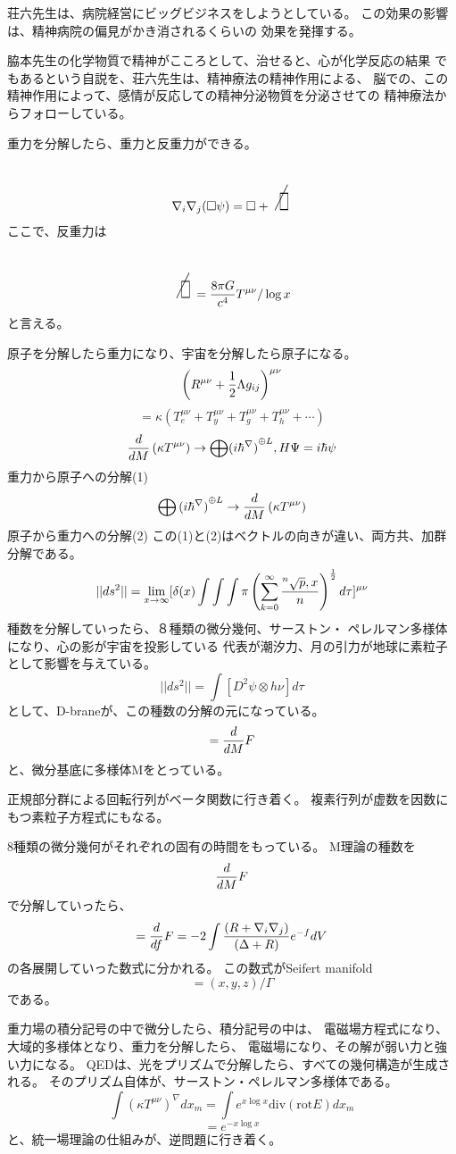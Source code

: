 \documentclass{jsarticle}
\begin{document}
    荘六先生は、病院経営にビッグビジネスをしようとしている。
    この効果の影響は、精神病院の偏見がかき消されるくらいの
    効果を発揮する。

    脇本先生の化学物質で精神がこころとして、治せると、心が化学反応の結果
    でもあるという自説を、荘六先生は、精神療法の精神作用による、
    脳での、この精神作用によって、感情が反応しての精神分泌物質を分泌させての
    精神療法からフォローしている。


      重力を分解したら、重力と反重力ができる。
  $$ \nabla_{i} \nabla_{j}(\square \psi) = \square + 
  \scalebox{1}[2]{\alearletter} $$
  ここで、反重力は
  $$ \scalebox{1}[2]{\alearletter} = 
  {{{{8 \pi G} \over {c^4}}T^{\mu\nu}}/ \log x} $$
  と言える。 

   

     原子を分解したら重力になり、宇宙を分解したら原子になる。
     $$ \left(R^{\mu\nu} + {1 \over 2}\Lambda g_{ij}\right)^{\mu\nu} $$
     $$ = \kappa \left( T^{\mu\nu}_e + T^{\mu\nu}_y + T^{\mu\nu}_g +
     T^{\mu\nu}_h + \cdots \right) $$
     $$ {d \over dM}\left({\kappa T^{\mu\nu}} \right) \to {\bigoplus 
     ({i {\hbar^{{\nabla}}})}^{\oplus L}}, H \Psi = i \hbar \psi $$
     重力から原子への分解(1)
     $$ \bigoplus {({i \hbar^{\nabla})}^{\oplus L}} \to
          {d \over dM}\left(\kappa T^{\mu\nu} \right) $$ 
	  原子から重力への分解(2)
	  この(1)と(2)はベクトルの向きが違い、両方共、加群分解である。
    $$ ||ds^2|| = \lim_{x \to \infty} [\delta(x) 
    \int \int \int \pi \left( \sum_{k=0}^{\infty}
		{{}^n\sqrt{p},x \over n} \right)^{1 \over 2}d \tau]^{\mu\nu} $$
		種数を分解していったら、８種類の微分幾何、サーストン・
		ペレルマン多様体になり、心の影が宇宙を投影している
		代表が潮汐力、月の引力が地球に素粒子として影響を与えている。
    $$ ||ds^2|| = \int [D^2 \psi \otimes h \nu]d \tau $$
    として、D-braneが、この種数の分解の元になっている。
    $$ = {d \over d M}F $$
    と、微分基底に多様体Mをとっている。

    正規部分群による回転行列がベータ関数に行き着く。
    複素行列が虚数を因数にもつ素粒子方程式にもなる。

    8種類の微分幾何がそれぞれの固有の時間をもっている。
    M理論の種数を
    $$ {d \over d M}F $$
    で分解していったら、
    $$ = {d \over df}F = {{-2 \int {(R + \nabla_{i}\nabla_{j}) \over 
     {(\Delta + R)}}}}e^{-f}dV $$
     の各展開していった数式に分かれる。
     この数式がSeifert manifold 
     $$ = (x,y,z) / \Gamma $$
     である。

     重力場の積分記号の中で微分したら、積分記号の中は、
     電磁場方程式になり、大域的多様体となり、重力を分解したら、
     電磁場になり、その解が弱い力と強い力になる。
     QEDは、光をプリズムで分解したら、すべての幾何構造が生成される。
     そのプリズム自体が、サーストン・ペレルマン多様体である。
     $$ \int \left({\kappa T^{\mu\nu}}\right)^{\nabla}dx_m
     = \int e^{x \log x}\mathrm{div}(\mathrm{rot} E)dx_m $$
     $$ = e^{- x \log x} $$
     と、統一場理論の仕組みが、逆問題に行き着く。
\end{document}
